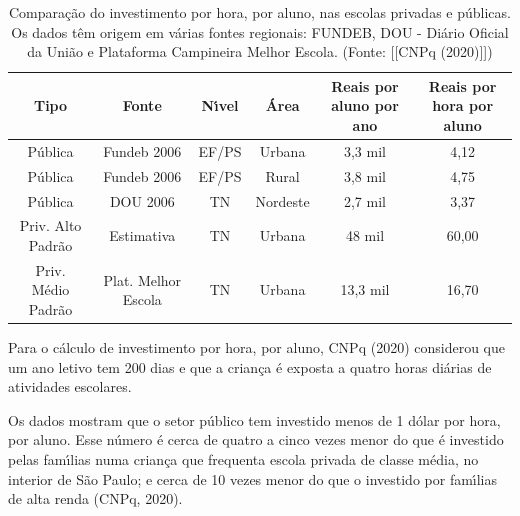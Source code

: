 \documentclass[
12pt,		%
openright,	%
twoside,  %
a4paper,			%
chapter=TITLE,		%
english,			%
french,				%
spanish,			%
brazil				%
]{USPSC-classe/USPSC}
\begin{document}
\begin{table}[htb]
\tiny
\caption{\label{489af209007e651b007535a7733d5ca117c5b310}Compara\c{c}\~ao do investimento por hora, por aluno, nas escolas privadas e p\'ublicas. Os dados t\^em origem em v\'arias fontes regionais: FUNDEB, DOU - Di\'ario Oficial da Uni\~ao e Plataforma Campineira Melhor Escola. (Fonte:  [[CNPq (2020)]])}

\centering
\begin{tabular}{|c|c|c|c|c|c|}
\hline
Tipo  &  Fonte  &  N\'{\i}vel  &  \'Area  &  Reais por aluno por ano  &  Reais por hora por aluno \\
\hline
P\'ublica  &  Fundeb 2006  &  EF/PS  &  Urbana  &  3,3 mil  &  4,12 \\
P\'ublica  &  Fundeb 2006  &  EF/PS  &  Rural  &  3,8 mil  &  4,75 \\
P\'ublica  &  DOU 2006  &  TN  &  Nordeste  &  2,7 mil  &  3,37 \\
Priv. Alto Padr\~ao  &  Estimativa  &  TN  &  Urbana  &  48 mil  &  60,00 \\
Priv. M\'edio Padr\~ao  &  Plat. Melhor Escola  &  TN  &  Urbana  &  13,3 mil  &  16,70 \\
\hline
\end{tabular}
\end{table}


Para o c\'alculo de investimento por hora, por aluno,  CNPq (2020) considerou que um ano letivo tem 200 dias e que a crian\c{c}a \'e exposta a quatro horas di\'arias de atividades escolares.

















Os dados mostram que o setor p\'ublico tem investido menos de 1 d\'olar por hora, por aluno. Esse n\'umero \'e cerca de quatro a cinco vezes menor do que \'e investido pelas fam\'{\i}lias numa crian\c{c}a que frequenta escola privada de classe m\'edia, no interior de S\~ao Paulo; e cerca de 10 vezes menor do que o investido por fam\'{\i}lias de alta renda  (CNPq, 2020).
\end{document}
